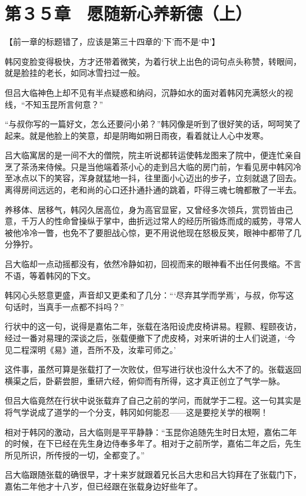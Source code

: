 \section{第３５章　愿随新心养新德（上）}

【前一章的标题错了，应该是第三十四章的‘下’而不是‘中’】

韩冈变脸变得极快，方才还带着微笑，为着行状上出色的词句点头称赞，转眼间，就是脸挂的老长，如同冰雪扫过一般。

但吕大临神色上却不见有半点疑惑和纳闷，沉静如水的面对着韩冈充满怒火的视线，“不知玉昆所言何意？”

“与叔你写的一篇好文，怎么还要问小弟？”韩冈像是听到了很好笑的话，呵呵笑了起来。就是他脸上的笑意，却是阴晦如朔日雨夜，看着就让人心中发寒。

吕大临寓居的是一间不大的僧院，院主听说都转运使韩龙图来了院中，便连忙亲自烹了茶汤来侍候。只是当他端着茶小心的走到吕大临的房门前，乍看见房中韩冈冷至冰点以下的笑容，浑身就猛地一抖，往里面小心迈出的步子，立刻就退了回去。离得房间远远的，老和尚的心口还扑通扑通的跳着，吓得三魂七魄都散了一半去。

养移体、居移气，韩冈久居高位，身为高官显宦，又曾经多次领兵，赏罚皆由己意，千万人的性命曾操纵于掌中，曲折远过常人的经历所锻炼而成的威势，寻常人被他冷冷一瞥，也免不了要胆战心惊，更不用说他现在怒极反笑，眼神中都带了几分狰狞。

吕大临却一点动摇都没有，依然冷静如初，回视而来的眼神看不出任何畏缩。不言不语，等着韩冈的下文。

韩冈心头怒意更盛，声音却又更柔和了几分：“‘尽弃其学而学焉’，与叔，你写这句话时，当真手一点都不抖吗？”

行状中的这一句，说得是嘉佑二年，张载在洛阳设虎皮椅讲易。程颢、程颐夜访，经过一番对易理的深谈之后，张载便撤下了虎皮椅，对来听讲的士人们说道，‘今见二程深明《易》道，吾所不及，汝辈可师之。’

这件事，虽然可算是张载打了一次败仗，但写进行状也没什么大不了的。张载返回横渠之后，卧薪尝胆，重研六经，俯仰而有所得，这才真正创立了气学一脉。

但吕大临竟然在行状中说张载弃了自己之前的学问，而就学于二程。这一句其实是将气学说成了道学的一个分支，韩冈如何能忍——这是要挖关学的根啊！

相对于韩冈的激动，吕大临则是平平静静：“玉昆你追随先生时日太短，嘉佑二年的时候，在下已经在先生身边侍奉多年了。相对于之前所学，嘉佑二年之后，先生所见所识，所传授的一切，全都变了。”

吕大临跟随张载的确很早，才十来岁就跟着兄长吕大忠和吕大钧拜在了张载门下，嘉佑二年他才十八岁，但已经跟在张载身边好些年了。

